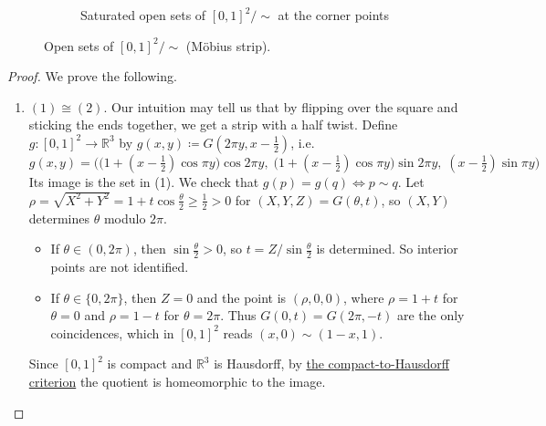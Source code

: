 \begin{definition}
\begin{enumerate}
\begin{figure}[H]
\begin{subfigure}[t]{0.32\textwidth}
						\caption{Saturated open sets of $[0,1]^2/{\sim}$ at the corner points}
						\label{fig:mob_sq_c}
					\end{subfigure}
					\caption{Open sets of $[0,1]^2/{\sim}$ (M\"obius strip).}
					\label{fig:mob_sq}
				\end{figure}
		\end{enumerate}

	\end{definition}
	\begin{proof}
	  We prove the following. 
		\begin{enumerate}
		  \item $(1) \cong (2)$. Our intuition may tell us that by flipping over the square and sticking the ends together, we get a strip with a half twist. Define $g: [0, 1]^2 \rightarrow \mathbb{R}^3$ by $g(x, y) \coloneqq G(2\pi y, x - \tfrac{1}{2})$, i.e. 
				\begin{equation}
					g(x, y) = \Big( \big(1 + (x - \tfrac{1}{2}) \cos \pi y \big) \cos 2\pi y, \; \big(1 + (x - \tfrac{1}{2}) \cos \pi y \big) \sin 2\pi y, \; (x - \tfrac{1}{2}) \sin \pi y \Big)
				\end{equation}
				Its image is the set in (1). We check that $g(p) = g(q) \iff p \sim q$. Let $\rho = \sqrt{X^2 + Y^2} = 1 + t \cos \frac{\theta}{2} \geq \tfrac{1}{2} > 0$ for $(X, Y, Z) = G(\theta, t)$, so $(X, Y)$ determines $\theta$ modulo $2\pi$. 
				\begin{itemize}
				  \item If $\theta \in (0, 2\pi)$, then $\sin \frac{\theta}{2} > 0$, so $t = Z / \sin \frac{\theta}{2}$ is determined. So interior points are not identified. 
					\item If $\theta \in \{0, 2\pi\}$, then $Z = 0$ and the point is $(\rho, 0, 0)$, where $\rho = 1 + t$ for $\theta = 0$ and $\rho = 1 - t$ for $\theta = 2\pi$. Thus $G(0, t) = G(2\pi, -t)$ are the only coincidences, which in $[0, 1]^2$ reads $(x, 0) \sim (1 - x, 1)$. 
				\end{itemize}
				Since $[0, 1]^2$ is compact and $\mathbb{R}^3$ is Hausdorff, by \hyperref[thm:compact_hausdorff_quotient]{the compact-to-Hausdorff criterion} the quotient is homeomorphic to the image. 
		\end{enumerate}
	\end{proof}

